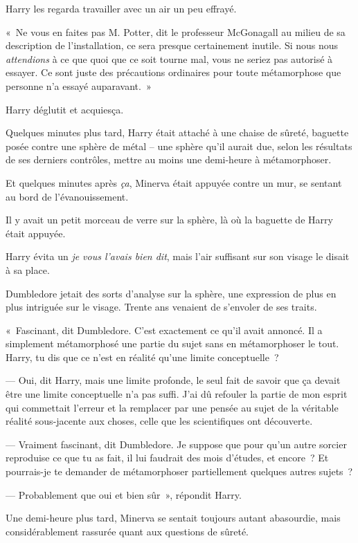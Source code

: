 Harry les regarda travailler avec un air un peu effrayé.

«~Ne vous en faites pas M. Potter, dit le professeur McGonagall au milieu de sa description de l'installation, ce sera presque certainement inutile.
Si nous nous \emph{attendions} à ce que quoi que ce soit tourne mal, vous ne seriez pas autorisé à essayer.
Ce sont juste des précautions ordinaires pour toute métamorphose que personne n'a essayé auparavant.~»

Harry déglutit et acquiesça.

Quelques minutes plus tard, Harry était attaché à une chaise de sûreté, baguette posée contre une sphère de métal -- une sphère qu'il aurait due, selon les résultats de ses derniers contrôles, mettre au moins une demi-heure à métamorphoser.

Et quelques minutes après \emph{ça}, Minerva était appuyée contre un mur, se sentant au bord de l'évanouissement.

Il y avait un petit morceau de verre sur la sphère, là où la baguette de Harry était appuyée.

Harry évita un \emph{je vous l'avais bien dit}, mais l'air suffisant sur son visage le disait à sa place.

Dumbledore jetait des sorts d'analyse sur la sphère, une expression de plus en plus intriguée sur le visage.
Trente ans venaient de s'envoler de ses traits.

«~Fascinant, dit Dumbledore.
C'est exactement ce qu'il avait annoncé.
Il a simplement métamorphosé une partie du sujet sans en métamorphoser le tout.
Harry, tu dis que ce n'est en réalité qu'une limite conceptuelle~?

--- Oui, dit Harry, mais une limite profonde, le seul fait de savoir que ça devait être une limite conceptuelle n'a pas suffi.
J'ai dû refouler la partie de mon esprit qui commettait l'erreur et la remplacer par une pensée au sujet de la véritable réalité sous-jacente aux choses, celle que les scientifiques ont découverte.

--- Vraiment fascinant, dit Dumbledore.
Je suppose que pour qu'un autre sorcier reproduise ce que tu as fait, il lui faudrait des mois d'études, et encore~?
Et pourrais-je te demander de métamorphoser partiellement quelques autres sujets~?

--- Probablement que oui et bien sûr~», répondit Harry.

Une demi-heure plus tard, Minerva se sentait toujours autant abasourdie, mais considérablement rassurée quant aux questions de sûreté.

